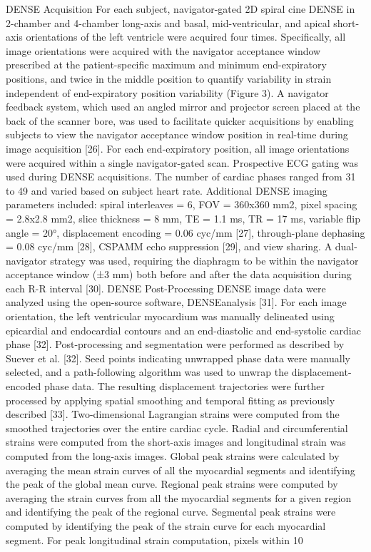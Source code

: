 	DENSE Acquisition
	For each subject, navigator-gated 2D spiral cine DENSE in 2-chamber and 4-chamber long-axis and basal, mid-ventricular, and apical short-axis orientations of the left ventricle were acquired four times. Specifically, all image orientations were acquired with the navigator acceptance window prescribed at the patient-specific maximum and minimum end-expiratory positions, and twice in the middle position to quantify variability in strain independent of end-expiratory position variability (Figure 3). A navigator feedback system, which used an angled mirror and projector screen placed at the back of the scanner bore, was used to facilitate quicker acquisitions by enabling subjects to view the navigator acceptance window position in real-time during image acquisition [26]. For each end-expiratory position, all image orientations were acquired within a single navigator-gated scan.
	Prospective ECG gating was used during DENSE acquisitions. The number of cardiac phases ranged from 31 to 49 and varied based on subject heart rate. Additional DENSE imaging parameters included: spiral interleaves = 6, FOV = 360x360 mm2, pixel spacing = 2.8x2.8 mm2, slice thickness = 8 mm, TE = 1.1 ms, TR = 17 ms, variable flip angle = 20°, displacement encoding = 0.06 cyc/mm [27], through-plane dephasing = 0.08 cyc/mm [28], CSPAMM echo suppression [29], and view sharing. A dual-navigator strategy was used, requiring the diaphragm to be within the navigator acceptance window (±3 mm) both before and after the data acquisition during each R-R interval [30].
	DENSE Post-Processing
	DENSE image data were analyzed using the open-source software, DENSEanalysis [31]. For each image orientation, the left ventricular myocardium was manually delineated using epicardial and endocardial contours and an end-diastolic and end-systolic cardiac phase [32]. Post-processing and segmentation were performed as described by Suever et al. [32]. Seed points indicating unwrapped phase data were manually selected, and a path-following algorithm was used to unwrap the displacement-encoded phase data. The resulting displacement trajectories were further processed by applying spatial smoothing and temporal fitting as previously described [33].
	Two-dimensional Lagrangian strains were computed from the smoothed trajectories over the entire cardiac cycle. Radial and circumferential strains were computed from the short-axis images and longitudinal strain was computed from the long-axis images. Global peak strains were calculated by averaging the mean strain curves of all the myocardial segments and identifying the peak of the global mean curve. Regional peak strains were computed by averaging the strain curves from all the myocardial segments for a given region and identifying the peak of the regional curve. Segmental peak strains were computed by identifying the peak of the strain curve for each myocardial segment. For peak longitudinal strain computation, pixels within 10%
